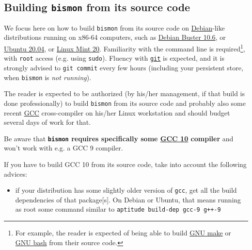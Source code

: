 

\begin{appendices}


\section{Building \texttt{bismon} from its source code}
\label{sec:building-bismon}

We focus here on how to build \texttt{bismon} from its source code on
\href{http://debian.org/}{Debian}-like distributions running on x86-64
computers, such as
\href{https://www.debian.org/releases/stable/}{Debian Buster 10.6}, or
\href{https://ubuntu.com/}{Ubuntu 20.04}, or
\href{https://linuxmint.com/}{Linux Mint 20}. Familiarity with the
command line is required\footnote{For example, the reader is expected
  of being able to build \href{https://www.gnu.org/software/make/}{GNU
    make} or \href{https://www.gnu.org/software/bash/}{GNU bash} from
  their source code.}, with \texttt{root} access (e.g. using
\texttt{sudo}). Fluency with \href{https://git-scm.com/}{\texttt{git}}
is expected, and it is strongly advised to \texttt{git commit} every
few hours (including your persistent store, when \texttt{bismon} is
\emph{not running}).

The reader is expected to be authorized (by his/her management, if
that build is done professionally) to build \texttt{bismon} from its
source code and probably also some recent
\href{https://gcc.gnu.org/}{GCC} cross-compiler on his/her Linux workstation
and should budget several days of work for that.


{\large Be aware that \textbf{\texttt{bismon} requires specifically some
  \href{https://gcc.gnu.org/gcc-10/}{GCC 10} compiler} and won't work
  with e.g. a GCC 9 compiler.}


If you have to build GCC 10 from its source code, take into account the following advices:

\begin{itemize}

\item if your distribution has some slightly older version of \texttt{gcc}, get all the build dependencies of that package[s]. On Debian or Ubuntu, that means running as root some command similar to \texttt{aptitude build-dep gcc-9 g++-9}


\end{itemize}
\end{appendices}
